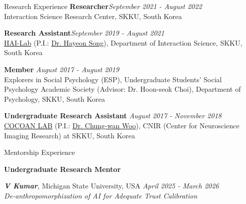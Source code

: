 \documentclass{resume} %
\begin{document}
\begin{rSection}{Research Experience}
{\bf Researcher}\hfill {\em September 2021 - August 2022} 
\\ Interaction Science Research Center, SKKU, South Korea

{\bf Research Assistant}\hfill {\em September 2019 - August 2021} 
\\ \href{https://sites.google.com/view/hailabskku}{HAI-Lab} (P.I.: \href{https://scholar.google.com/citations?hl=ko&user=BO-AgNYAAAAJ}{Dr. Hayeon Song}),
Department of Interaction Science, SKKU, South Korea

{\bf Member} \hfill {\em August 2017 - August 2019} 
\\  Explorers in Social Psychology (ESP), Undergraduate Students' Social Psychology Academic Society (Advisor: Dr. Hoon-seok Choi), Department of Psychology, SKKU, South Korea

{\bf Undergraduate Research Assistant} \hfill {\em August 2017 - November 2018} 
\\ \href{https://cocoanlab.github.io/}{COCOAN LAB} (P.I.: \href{https://cocoanlab.github.io/pdfs/CV_Woo_April2019.pdf}{Dr. Chung-wan Woo}), CNIR (Center for Neuroscience Imaging Research) at SKKU, South Korea






\end{rSection}


\begin{rSection}{Mentorship Experience}

{\bf Undergraduate Research Mentor}

\textit{\textbf{V Kumar}}, Michigan State University, USA \hfill {\em April 2025 - March 2026}
\\ \textit{De-anthropomorphization of AI for Adequate Trust Calibration}



\end{rSection}
\end{document}
